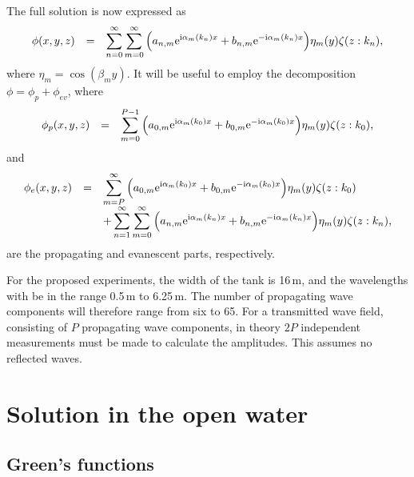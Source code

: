 \documentclass[12pt,a4paper]{article}
\newcommand{\vp}{{\phi}}
\newcommand{\vm}{{\zeta}}
\newcommand{\ym}{{\eta}}
\newcommand{\kx}{\alpha}
\newcommand{\ky}{\beta}
\begin{document}
The full solution is now expressed as
\begin{equation}
\label{eq:PotOW}
\begin{array}{rcl}
\vp(x,y,z)
&
=
&
\ds
\sum_{n=0}^{\infty}
\sum_{m=0}^{\infty}
\Big(
a_{n,m}\exp^{\ci\kx_{m}(k_{n}) x}
+
b_{n,m}\exp^{-\ci\kx_{m}(k_{n}) x}
\Big)
\ym_{m}(y)
\vm(z:k_{n}),
\end{array}
\end{equation}
where $\ym_{m}=\cos(\ky_{m}y)$.
It will be useful to employ the decomposition $\vp=\vp_{p}+\vp_{ev}$, where
\begin{equation}
\begin{array}{rcl}
\vp_{p}(x,y,z)
&
=
&
\ds
\sum_{m=0}^{P-1}
\Big(
a_{0,m}\exp^{\ci\kx_{m}(k_{0}) x}
+
b_{0,m}\exp^{-\ci\kx_{m}(k_{0}) x}
\Big)
\ym_{m}(y)
\vm(z:k_{0}),
\end{array}
\end{equation}
and
\begin{equation}
\begin{array}{rcl}
\vp_{e}(x,y,z)
&
=
&
\ds
\sum_{m=P}^{\infty}
\Big(
a_{0,m}\exp^{\ci\kx_{m}(k_{0}) x}
+
b_{0,m}\exp^{-\ci\kx_{m}(k_{0}) x}
\Big)
\ym_{m}(y)
\vm(z:k_{0})
\\[8pt]
&
&
\ds
+
\sum_{n=1}^{\infty}
\sum_{m=0}^{\infty}
\Big(
a_{n,m}\exp^{\ci\kx_{m}(k_{n}) x}
+
b_{n,m}\exp^{-\ci\kx_{m}(k_{n}) x}
\Big)
\ym_{m}(y)
\vm(z:k_{n}),
\end{array}
\end{equation}
are the propagating and evanescent parts, respectively.

For the proposed experiments, the width of the tank is 16\,m, and the wavelengths with be in the range 0.5\,m to 6.25\,m.
The number of propagating wave components will therefore range from six to 65.
For a transmitted wave field, consisting of $P$ propagating wave components, in theory $2P$ independent measurements must be made to calculate the amplitudes.
This assumes no reflected waves.


\section{Solution in the open water}
\label{sec2}


\subsection{Green's functions}
\end{document}
